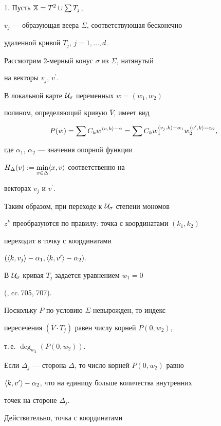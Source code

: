 \begin{pf}


1. Пусть $\Bbb X=T^2\cup\sum T_j$,


$v_j$ --- образующая веера $\Sigma$, соответствующая бесконечно


удаленной кривой $T_j$, $j=1,\dotsc,d$.


Рассмотрим 2-мерный конус $\sigma$ из $\Sigma$, натянутый


на векторы $v_j$, $v^{\prime}$.


В локальной карте $\cal U_{\sigma}$ переменных $w=(w_1,w_2)$


полином, определяющий кривую $\overline{V}$, имеет вид


$$


P(w)=\sum C_k w^{\la v,k\ra-\alpha}=


\sum C_k w_1^{\la v_j,k\ra-\alpha_1}w_2^{\la v^{\prime},k\ra-\alpha_2},


$$


где $\alpha_1$, $\alpha_2$ --- значения опорной функции


$H_{\Delta}(v):= \min\limits_{x\in\Delta}\langle x,v\rangle$ соответственно на


векторах $v_j$ и $v^{\prime}$.


Таким образом, при переходе к $\cal U_{\sigma}$ степени мономов


$z^k$ преобразуются по правилу: точка с координатами $(k_1,k_2)$


переходит в точку с координатами


$(\langle k,v_j\rangle -\alpha_1,\langle k,v^{\prime}\rangle-\alpha_2 ).$


В $\cal U_{\sigma}$ кривая $T_{j}$ задается уравнением $w_1=0$


(\cite{1}, cc.\,705, 707).


Поскольку $P$ по условию $\Sigma$-невырожден, то индекс 


пересечения $(\overline V\cdot T_{j})$ равен числу корней $P(0,w_2)$,


т.\,е. $\deg_{w_2}\left (P(0,w_2)\right )$.





Если $\Delta_j$ --- сторона $\Delta$, то число корней $P(0,w_2)$ равно


$\langle k,v^{\prime}\rangle-\alpha_2$, что на единицу больше количества внутренних


точек на стороне $\Delta_j$.


Действительно, точка с координатами



\end{pf}
